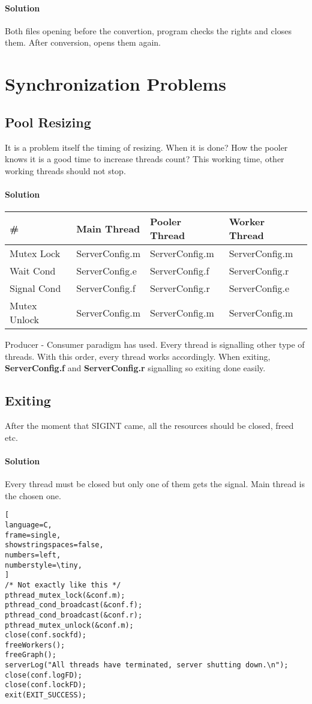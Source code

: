 \documentclass[11pt]{scrartcl} %
\begin{document}
\paragraph{Solution}
Both files opening before the convertion, program checks the rights and closes them. After conversion, opens them again.

\section{Synchronization Problems}

\subsection{Pool Resizing}
It is a problem itself the timing of resizing. When it is done? How the pooler knows it is a good time to increase threads count? This working time, other working threads should not stop.
\paragraph{Solution}
\begin{table}[]
	\centering
	\begin{tabular}{l|lll}
	\#           & Main Thread    & Pooler Thread  & Worker Thread  \\ \hline
	Mutex Lock   & ServerConfig.m & ServerConfig.m & ServerConfig.m \\
	Wait Cond    & ServerConfig.e & ServerConfig.f & ServerConfig.r \\
	Signal Cond  & ServerConfig.f & ServerConfig.r & ServerConfig.e \\
	Mutex Unlock & ServerConfig.m & ServerConfig.m & ServerConfig.m
	\end{tabular}
\end{table}
Producer - Consumer paradigm has used. Every thread is signalling other type of threads. With this order, every thread works accordingly. When exiting, \textbf{ServerConfig.f} and \textbf{ServerConfig.r} signalling so exiting done easily.

\subsection{Exiting}
After the moment that SIGINT came, all the resources should be closed, freed etc.
\paragraph{Solution} Every thread must be closed but only one of them gets the signal. Main thread is the chosen one.
\begin{lstlisting}[
language=C,
frame=single,
showstringspaces=false,
numbers=left,
numberstyle=\tiny,
]
/* Not exactly like this */
pthread_mutex_lock(&conf.m);
pthread_cond_broadcast(&conf.f);
pthread_cond_broadcast(&conf.r);
pthread_mutex_unlock(&conf.m);
close(conf.sockfd);
freeWorkers();
freeGraph();
serverLog("All threads have terminated, server shutting down.\n");
close(conf.logFD);
close(conf.lockFD);
exit(EXIT_SUCCESS);
\end{lstlisting}
\end{document}
